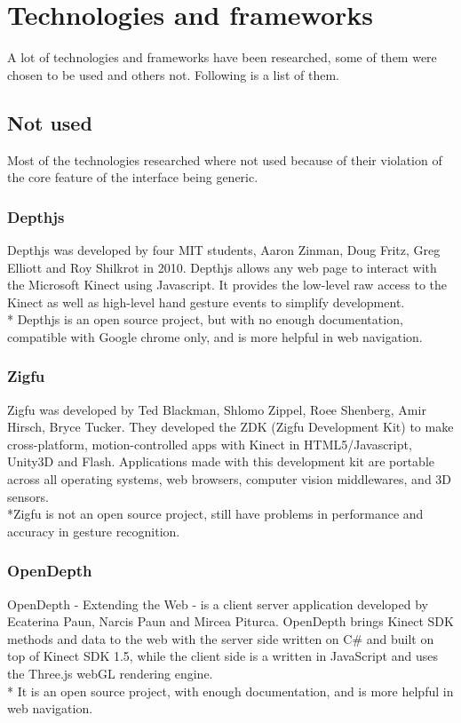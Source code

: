 \documentclass[a4paper]{article}
\begin{document}
\section{Technologies and frameworks}
A lot of technologies and frameworks have been researched, some of them were chosen to be used and others not. Following is a list of them.

\subsection{Not used}
Most of the technologies researched where not used because of their violation of the core feature of the interface being generic.

\subsubsection{Depthjs}
Depthjs was developed by four MIT students, Aaron Zinman, Doug Fritz, Greg Elliott and Roy Shilkrot in 2010. Depthjs allows any web page to interact with the Microsoft Kinect using Javascript. It provides the low-level raw access to the Kinect as well as high-level hand gesture events to simplify development.
\\* Depthjs is an open source project, but with no enough documentation, compatible with Google chrome only, and is more helpful in web navigation.

\subsubsection{Zigfu}
Zigfu was developed by Ted Blackman, Shlomo Zippel, Roee Shenberg, Amir Hirsch, Bryce Tucker. They developed the ZDK (Zigfu Development Kit) to make cross-platform, motion-controlled apps with Kinect in HTML5/Javascript, Unity3D and Flash. Applications made with this development kit are portable across all operating systems, web browsers, computer vision middlewares, and 3D sensors. 
\\*Zigfu is not an open source project, still have problems in performance and accuracy in gesture recognition.


\subsubsection{OpenDepth}
OpenDepth - Extending the Web - is a client server application developed by Ecaterina Paun, Narcis Paun and Mircea Piturca. OpenDepth brings Kinect SDK methods and data to the web with the server side written on C\# and built on top of Kinect SDK 1.5, while the client side is a written in JavaScript and uses the Three.js webGL rendering engine.
\\* It is an open source project, with enough documentation, and is more helpful in web navigation.
\end{document}
